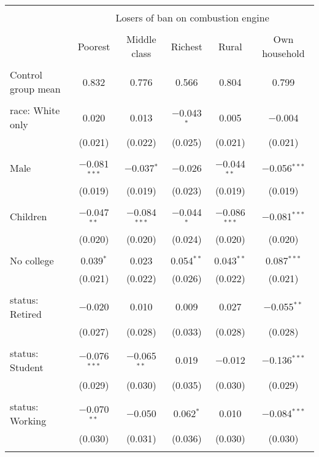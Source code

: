 
\begin{tabular}{@{\extracolsep{5pt}}lccccc} 
\\[-1.8ex]\hline 
\hline \\[-1.8ex] 
 & \multicolumn{5}{c}{Losers of ban on combustion engine} \\ 
\cline{2-6} 
\\[-1.8ex] & Poorest & Middle class & Richest & Rural & Own household \\ 
\hline \\[-1.8ex] 
 Control group mean & 0.832 & 0.776 & 0.566 & 0.804 & 0.799  \\ \hline \\[-1.8ex] race: White only & 0.020 & 0.013 & $-$0.043$^{*}$ & 0.005 & $-$0.004 \\ 
  & (0.021) & (0.022) & (0.025) & (0.021) & (0.021) \\ 
  & & & & & \\ 
 Male & $-$0.081$^{***}$ & $-$0.037$^{*}$ & $-$0.026 & $-$0.044$^{**}$ & $-$0.056$^{***}$ \\ 
  & (0.019) & (0.019) & (0.023) & (0.019) & (0.019) \\ 
  & & & & & \\ 
 Children & $-$0.047$^{**}$ & $-$0.084$^{***}$ & $-$0.044$^{*}$ & $-$0.086$^{***}$ & $-$0.081$^{***}$ \\ 
  & (0.020) & (0.020) & (0.024) & (0.020) & (0.020) \\ 
  & & & & & \\ 
 No college & 0.039$^{*}$ & 0.023 & 0.054$^{**}$ & 0.043$^{**}$ & 0.087$^{***}$ \\ 
  & (0.021) & (0.022) & (0.026) & (0.022) & (0.021) \\ 
  & & & & & \\ 
 status: Retired & $-$0.020 & 0.010 & 0.009 & 0.027 & $-$0.055$^{**}$ \\ 
  & (0.027) & (0.028) & (0.033) & (0.028) & (0.028) \\ 
  & & & & & \\ 
 status: Student & $-$0.076$^{***}$ & $-$0.065$^{**}$ & 0.019 & $-$0.012 & $-$0.136$^{***}$ \\ 
  & (0.029) & (0.030) & (0.035) & (0.030) & (0.029) \\ 
  & & & & & \\ 
 status: Working & $-$0.070$^{**}$ & $-$0.050 & 0.062$^{*}$ & 0.010 & $-$0.084$^{***}$ \\ 
  & (0.030) & (0.031) & (0.036) & (0.030) & (0.030) \\ 
  & & & & & \\ 

\end{tabular}
